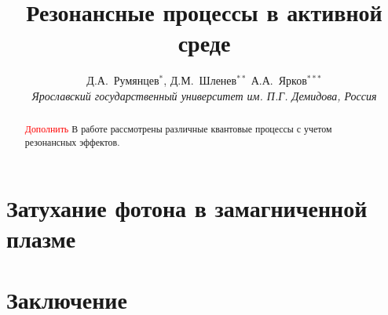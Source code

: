 \documentclass[12pt]{article}
\title{Резонансные процессы в активной среде}
\author{Д.А.~Румянцев$^{*}$, Д.М.~Шленев$^{**}$
А.А.~Ярков$^{***}$
\\
{\it Ярославский государственный университет им. П.Г. Демидова, Россия}}
\date{}
\begin{document}
\large
\maketitle
\def\abstractname{\empty}
\baselineskip=22pt

\begin{abstract}

\baselineskip=20pt

{\large  \textcolor{red}{Дополнить} В работе рассмотрены различные квантовые процессы с учетом резонансных эффектов.}
\end{abstract}

{\def\thefootnote{*}
\def\thefootnote{**}
\def\thefootnote{***}
}

\newpage
\unitlength 1mm




\label{Ch:WaveF}
\label{Ch:Propagator}

\label{Ch:Compton}




\section{Затухание фотона в замагниченной плазме}\label{Ch:DampPhot}

\section{Заключение}

\newpage
%


\end{document}
